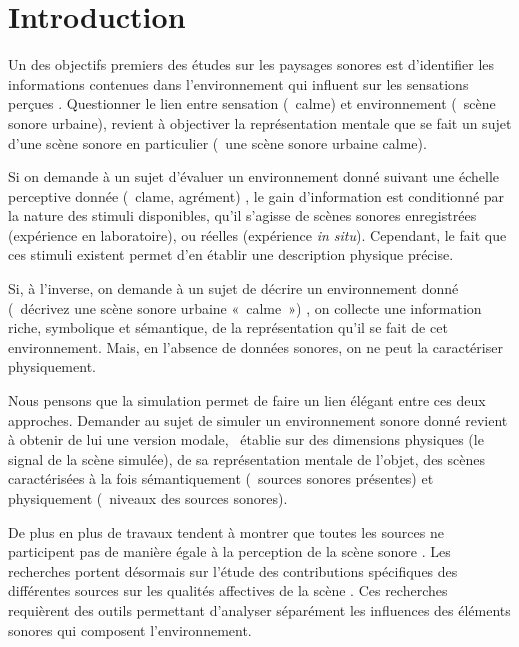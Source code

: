 \documentclass[twoside,twocolumn]{article}
\begin{document}

\setlength{\parindent}{5ex}

\section{Introduction}
\label{sec:intro}

Un des objectifs premiers des études sur les paysages sonores est d'identifier les informations contenues dans l'environnement qui influent sur les sensations perçues \cite{aletta2016soundscape}. Questionner le lien entre sensation (\eg~calme) et environnement (\eg~scène sonore urbaine), revient à objectiver la représentation mentale que se fait un sujet d'une scène sonore en particulier (\eg~une scène sonore urbaine calme).

Si on demande à un sujet d'évaluer un environnement donné suivant une échelle perceptive donnée (\eg~clame, agrément) \cite{axelsson2005soundscape,davies2013perception,cain2013development}, le gain d'information est conditionné par la nature des stimuli disponibles, qu'il s'agisse de scènes sonores enregistrées (expérience en laboratoire), ou réelles (expérience \emph{in situ}). Cependant, le fait que ces stimuli existent permet d'en établir une description physique précise.

Si, à l'inverse, on demande à un sujet de décrire un environnement donné (\eg~décrivez une scène sonore urbaine «~calme~») \cite{guastavino2006ideal, dubois2006cognitive}, on collecte une information riche, symbolique et sémantique, de la représentation qu'il se fait de cet environnement. Mais, en l'absence de données sonores, on ne peut la caractériser physiquement.

Nous pensons que la simulation permet de faire un lien élégant entre ces deux approches. Demander au sujet de simuler un environnement sonore donné revient à obtenir de lui une version modale, \ie~établie sur des dimensions physiques (le signal de la scène simulée), de sa représentation mentale de l'objet, des scènes caractérisées à la fois sémantiquement (\eg~sources sonores présentes) et physiquement (\eg~niveaux des sources sonores).
 
De plus en plus de travaux tendent à montrer que toutes les sources ne participent pas de manière égale à la perception de la scène sonore \cite{defreville2004aactivity,lavandier2006contribution,guastavino2006ideal,nilsson2007soundscape,
szeremeta2009analysis}. Les recherches portent désormais sur l'étude des contributions spécifiques des différentes sources sur les qualités affectives de la scène \cite{gozalo2015relationship,ricciardi2015sound}. Ces recherches requièrent des outils permettant d'analyser séparément les influences des éléments sonores qui composent l'environnement.
\end{document}
